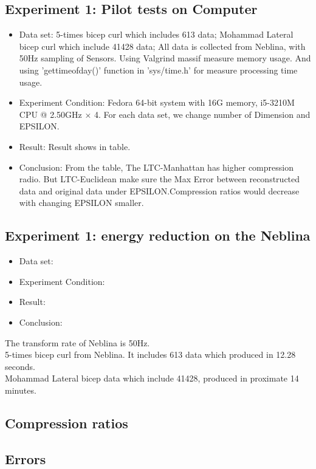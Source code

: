 \documentclass[10pt, conference, compsocconf]{IEEEtran}
\begin{document}
\subsection{Experiment 1: Pilot tests on Computer}
\begin{itemize}
    \item Data set: 5-times bicep curl which includes 613 data; 
                    Mohammad Lateral bicep curl which include 41428 data; 
                    All data is collected from Neblina, with 50Hz sampling of Sensors.
                    Using Valgrind massif measure memory usage. And using 'gettimeofday()' function in 'sys/time.h' for measure processing time usage.
    \item Experiment Condition: Fedora 64-bit system with 16G memory, i5-3210M CPU @ 2.50GHz × 4. For each data set, we change number of Dimension and EPSILON.
    \item Result: Result shows in table.
    \item Conclusion: From the table, The LTC-Manhattan has higher compression radio. But LTC-Euclidean make sure the Max Error between reconstructed data and original data under EPSILON.Compression ratios would decrease with changing EPSILON smaller.
\end{itemize}

\subsection{Experiment 1: energy reduction on the Neblina}
\begin{itemize}
    \item Data set: 
    \item Experiment Condition: 
    \item Result: 
    \item Conclusion: 
\end{itemize}



The transform rate of Neblina is 50Hz.
\\
5-times bicep curl from Neblina. It includes 613 data which produced in 12.28 seconds. 
\\
Mohammad Lateral bicep data which include 41428, produced in proximate 14 minutes.

\subsection{Compression ratios}

\subsection{Errors}
\end{document}
